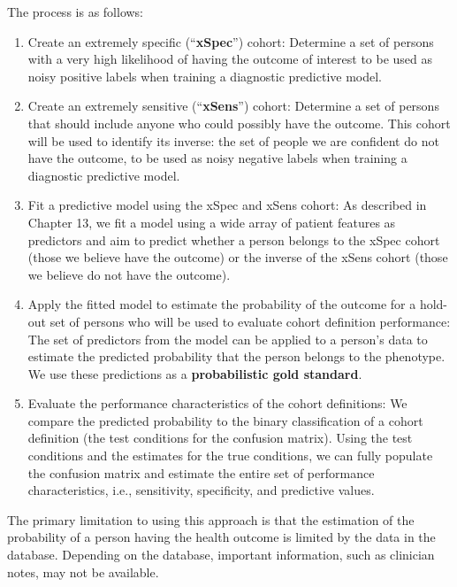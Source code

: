 \documentclass[
  letterpaper,
  paper=7in:10in,
  pagesize=pdftex,
  headinclude=on,
  footinclude=on,
  12pt]{scrbook}
\providecommand{\tightlist}{%
  \setlength{\itemsep}{0pt}\setlength{\parskip}{0pt}}\usepackage{longtable,booktabs,array}
\begin{document}
The process is as follows:

\begin{enumerate}
\def\labelenumi{\arabic{enumi}.}
\tightlist
\item
  Create an extremely specific (``\textbf{xSpec}'') cohort: Determine a
  set of persons with a very high likelihood of having the outcome of
  interest to be used as noisy positive labels when training a
  diagnostic predictive model.
\item
  Create an extremely sensitive (``\textbf{xSens}'') cohort: Determine a
  set of persons that should include anyone who could possibly have the
  outcome. This cohort will be used to identify its inverse: the set of
  people we are confident do not have the outcome, to be used as noisy
  negative labels when training a diagnostic predictive model.
\item
  Fit a predictive model using the xSpec and xSens cohort: As described
  in Chapter 13, we fit a model using a wide array of patient features
  as predictors and aim to predict whether a person belongs to the xSpec
  cohort (those we believe have the outcome) or the inverse of the xSens
  cohort (those we believe do not have the outcome).
\item
  Apply the fitted model to estimate the probability of the outcome for
  a hold-out set of persons who will be used to evaluate cohort
  definition performance: The set of predictors from the model can be
  applied to a person's data to estimate the predicted probability that
  the person belongs to the phenotype. We use these predictions as a
  \textbf{probabilistic gold standard}.
\item
  Evaluate the performance characteristics of the cohort definitions: We
  compare the predicted probability to the binary classification of a
  cohort definition (the test conditions for the confusion matrix).
  Using the test conditions and the estimates for the true conditions,
  we can fully populate the confusion matrix and estimate the entire set
  of performance characteristics, i.e., sensitivity, specificity, and
  predictive values.
\end{enumerate}

The primary limitation to using this approach is that the estimation of
the probability of a person having the health outcome is limited by the
data in the database. Depending on the database, important information,
such as clinician notes, may not be available.
\end{document}

